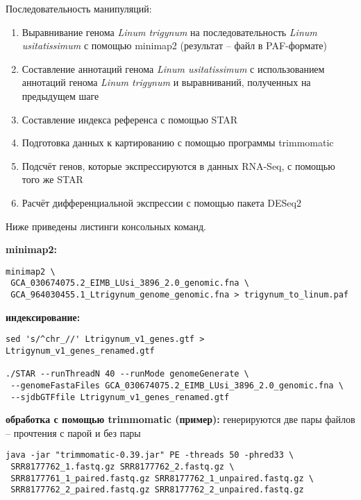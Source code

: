 Последовательность манипуляций:
\begin{enumerate}
    \item Выравнивание генома \textit{Linum trigynum} на последовательность \textit{Linum usitatissimum} с помощью minimap2 \cite{li2018minimap2} (результат -- файл в PAF-формате)
    \item Составление аннотаций генома \textit{Linum usitatissimum} с использованием аннотаций генома \textit{Linum trigynum} и выравниваний, полученных на предыдущем шаге
    \item Составление индекса референса с помощью STAR \cite{dobin2013star}
    \item Подготовка данных к картированию с помощью программы trimmomatic \cite{bolger2014trimmomatic}
    \item Подсчёт генов, которые экспрессируются в данных RNA-Seq, с помощью того же STAR
    \item Расчёт дифференциальной экспрессии с помощью пакета DESeq2 \cite{love2014differential}
\end{enumerate}

Ниже приведены листинги консольных команд.

\textbf{minimap2:}

\begin{verbatim}
minimap2 \
 GCA_030674075.2_EIMB_LUsi_3896_2.0_genomic.fna \
 GCA_964030455.1_Ltrigynum_genome_genomic.fna > trigynum_to_linum.paf
\end{verbatim}

\textbf{индексирование:}

\begin{verbatim}
sed 's/^chr_//' Ltrigynum_v1_genes.gtf > Ltrigynum_v1_genes_renamed.gtf

./STAR --runThreadN 40 --runMode genomeGenerate \
 --genomeFastaFiles GCA_030674075.2_EIMB_LUsi_3896_2.0_genomic.fna \
 --sjdbGTFfile Ltrigynum_v1_genes_renamed.gtf
\end{verbatim}

\textbf{обработка с помощью trimmomatic (пример):} генерируются две пары файлов -- прочтения с парой и без пары

\begin{verbatim}
java -jar "trimmomatic-0.39.jar" PE -threads 50 -phred33 \
 SRR8177762_1.fastq.gz SRR8177762_2.fastq.gz \
 SRR8177761_1_paired.fastq.gz SRR8177762_1_unpaired.fastq.gz \
 SRR8177762_2_paired.fastq.gz SRR8177762_2_unpaired.fastq.gz
\end{verbatim}

